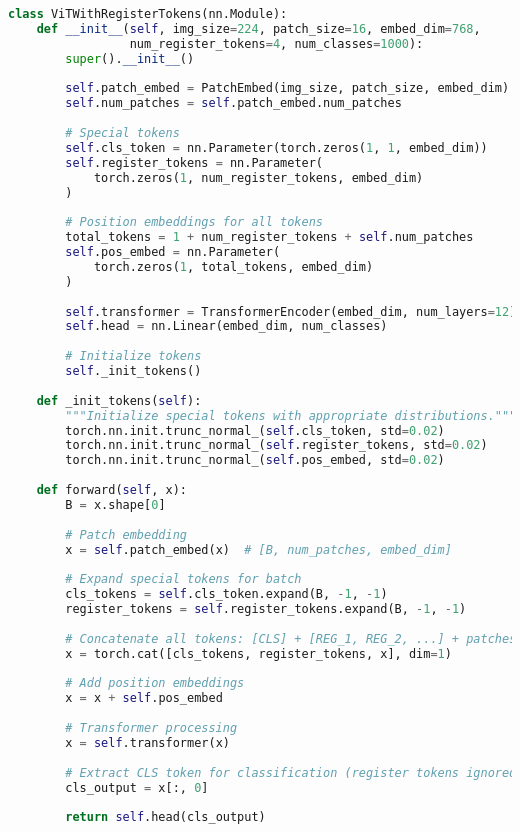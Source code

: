 \begin{lstlisting}[language=Python, caption=Register token integration in Vision Transformer]
class ViTWithRegisterTokens(nn.Module):
    def __init__(self, img_size=224, patch_size=16, embed_dim=768, 
                 num_register_tokens=4, num_classes=1000):
        super().__init__()
        
        self.patch_embed = PatchEmbed(img_size, patch_size, embed_dim)
        self.num_patches = self.patch_embed.num_patches
        
        # Special tokens
        self.cls_token = nn.Parameter(torch.zeros(1, 1, embed_dim))
        self.register_tokens = nn.Parameter(
            torch.zeros(1, num_register_tokens, embed_dim)
        )
        
        # Position embeddings for all tokens
        total_tokens = 1 + num_register_tokens + self.num_patches
        self.pos_embed = nn.Parameter(
            torch.zeros(1, total_tokens, embed_dim)
        )
        
        self.transformer = TransformerEncoder(embed_dim, num_layers=12)
        self.head = nn.Linear(embed_dim, num_classes)
        
        # Initialize tokens
        self._init_tokens()
    
    def _init_tokens(self):
        """Initialize special tokens with appropriate distributions."""
        torch.nn.init.trunc_normal_(self.cls_token, std=0.02)
        torch.nn.init.trunc_normal_(self.register_tokens, std=0.02)
        torch.nn.init.trunc_normal_(self.pos_embed, std=0.02)
    
    def forward(self, x):
        B = x.shape[0]
        
        # Patch embedding
        x = self.patch_embed(x)  # [B, num_patches, embed_dim]
        
        # Expand special tokens for batch
        cls_tokens = self.cls_token.expand(B, -1, -1)
        register_tokens = self.register_tokens.expand(B, -1, -1)
        
        # Concatenate all tokens: [CLS] + [REG_1, REG_2, ...] + patches
        x = torch.cat([cls_tokens, register_tokens, x], dim=1)
        
        # Add position embeddings
        x = x + self.pos_embed
        
        # Transformer processing
        x = self.transformer(x)
        
        # Extract CLS token for classification (register tokens ignored)
        cls_output = x[:, 0]
        
        return self.head(cls_output)
\end{lstlisting}

